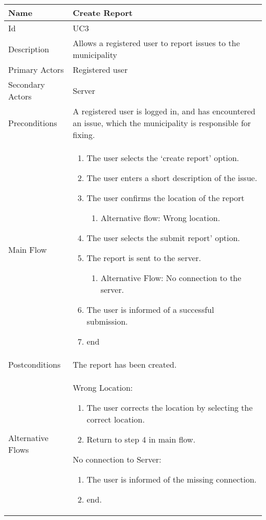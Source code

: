 \begin{tabularx}{\textwidth}{|l|X|}
\hline
Name              & Create Report\\ \hline 
Id                & UC3 \\ \hline
Description       & Allows a registered user to report issues to the municipality \\ \hline
Primary Actors    & Registered user \\ \hline
Secondary Actors  & Server \\ \hline
Preconditions     & A registered user is logged in, and has encountered an issue, which the municipality is responsible for fixing. \\ \hline
Main Flow         &
{\footnotesize \begin{enumerate}
\item The user selects the ‘create report’ option.
\item The user enters a short description of the issue.
\item The user confirms the location of the report
\begin{enumerate}
\item Alternative flow: Wrong location.
\end{enumerate}
\item The user selects the submit report’ option.
\item The report is sent to the server.
\begin{enumerate}
\item Alternative Flow: No connection to the server.
\end{enumerate}
\item The user is informed of a successful submission.
\item end
\end{enumerate}} \\ \hline
Postconditions    & The report has been created. \\ \hline
Alternative Flows & 
Wrong Location:
{\footnotesize \begin{enumerate}
\item The user corrects the location by selecting the correct location.
\item Return to step 4 in main flow.
\end{enumerate}}
No connection to Server:
{\footnotesize \begin{enumerate}
\item The user is informed of the missing connection.
\item end.
\end{enumerate}}
\\ \hline
\end{tabularx}

